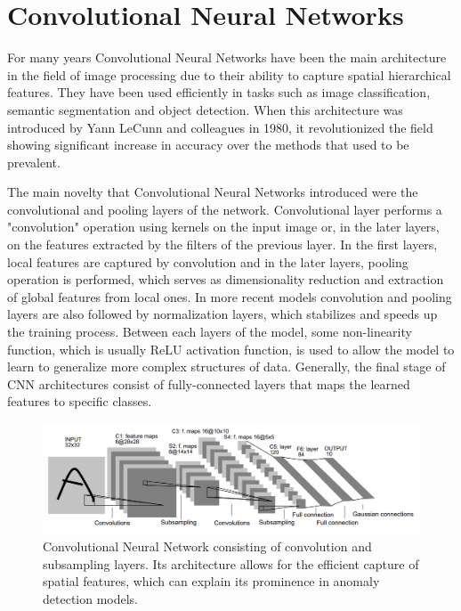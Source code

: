 \section{Convolutional Neural Networks}
\label{cnn}

For many years Convolutional Neural Networks have been the main architecture in the field of image processing due to their ability to capture spatial hierarchical features. They have been used efficiently in tasks such as image classification, semantic segmentation and object detection. When this architecture was introduced by Yann LeCunn and colleagues in 1980, it revolutionized the field showing significant increase in accuracy over the methods that used to be prevalent.

The main novelty that Convolutional Neural Networks introduced were the convolutional and pooling layers of the network. Convolutional layer performs a "convolution" operation using kernels on the input image or, in the later layers, on the features extracted by the filters of the previous layer. In the first layers, local features are captured by convolution and in the later layers, pooling operation is performed, which serves as dimensionality reduction and extraction of global features from local ones. In more recent models convolution and pooling layers are also followed by normalization layers, which stabilizes and speeds up the training process. Between each layers of the model, some non-linearity function, which is usually ReLU activation function, is used to allow the model to learn to generalize more complex structures of data. Generally, the final stage of CNN architectures consist of fully-connected layers that maps the learned features to specific classes.

\begin{figure}[t]
	\begin{center}
		\includegraphics[width=1.0\linewidth]{Chapter_2/cnn.png}
	\end{center}
	\caption{Convolutional Neural Network consisting of convolution and subsampling layers. Its architecture allows for the efficient capture of spatial features, which can explain its prominence in anomaly detection models.}
	\label{fig:cnn}
\end{figure}


